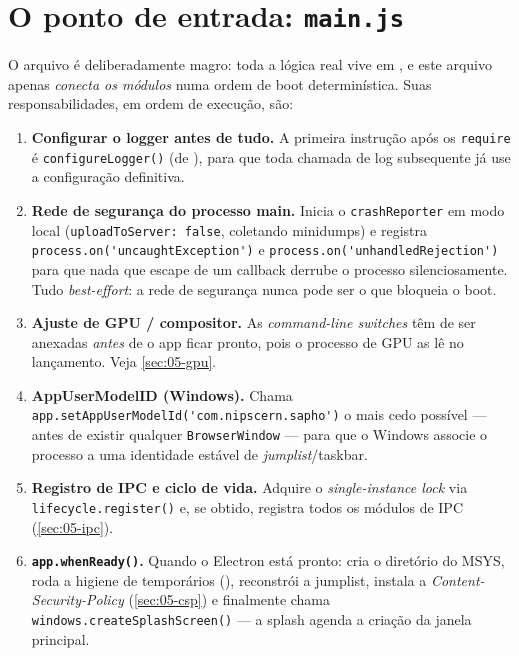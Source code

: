 \section{O ponto de entrada: \texttt{main.js}}
\label{sec:05-mainjs}

O arquivo  é deliberadamente magro: toda a lógica real vive em
, e este arquivo apenas \emph{conecta os módulos} numa ordem de boot
determinística. Suas responsabilidades, em ordem de execução, são:

\begin{enumerate}[leftmargin=*]
  \item \textbf{Configurar o logger antes de tudo.} A primeira instrução após os
    \lstinline|require| é \lstinline|configureLogger()| (de ),
    para que toda chamada de log subsequente já use a configuração definitiva.
  \item \textbf{Rede de segurança do processo main.} Inicia o
    \lstinline|crashReporter| em modo local (\lstinline|uploadToServer: false|,
    coletando minidumps) e registra \lstinline|process.on('uncaughtException')|
    e \lstinline|process.on('unhandledRejection')| para que nada que escape de um
    callback derrube o processo silenciosamente. Tudo \emph{best-effort}: a rede
    de segurança nunca pode ser o que bloqueia o boot.
  \item \textbf{Ajuste de GPU / compositor.} As \emph{command-line switches} têm
    de ser anexadas \emph{antes} de o app ficar pronto, pois o processo de GPU as
    lê no lançamento. Veja \autoref{sec:05-gpu}.
  \item \textbf{AppUserModelID (Windows).} Chama
    \lstinline|app.setAppUserModelId('com.nipscern.sapho')| o mais cedo possível
    --- antes de existir qualquer \lstinline|BrowserWindow| --- para que o Windows
    associe o processo a uma identidade estável de \emph{jumplist}/taskbar.
  \item \textbf{Registro de IPC e ciclo de vida.} Adquire o \emph{single-instance
    lock} via \lstinline|lifecycle.register()| e, se obtido, registra todos os
    módulos de IPC (\autoref{sec:05-ipc}).
  \item \textbf{\lstinline|app.whenReady()|.} Quando o Electron está pronto:
    cria o diretório  do MSYS, roda a higiene de temporários
    (), reconstrói a jumplist, instala a
    \emph{Content-Security-Policy} (\autoref{sec:05-csp}) e finalmente chama
    \lstinline|windows.createSplashScreen()| --- a splash agenda a criação da
    janela principal.
\end{enumerate}

